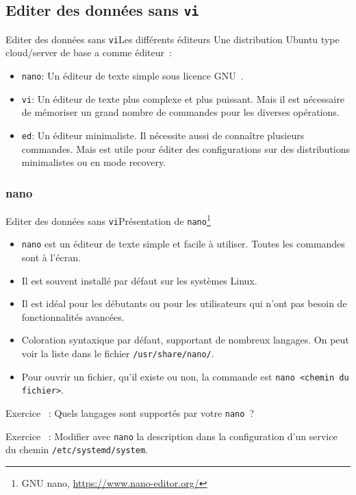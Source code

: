 \documentclass{beamer}
\begin{document}
    \subsection{Editer des données sans \lstinline{vi}}\label{subsec:edit-whithout-vi}


    \begin{frame}{Editer des données sans \lstinline{vi}}{Les différents éditeurs}
        Une distribution Ubuntu type cloud/server de base a comme éditeur~:
        \begin{itemize}
            \item \lstinline{nano}: Un éditeur de texte simple sous licence GNU~.
            \item \lstinline{vi}: Un éditeur de texte plus complexe et plus puissant.
            Mais il est nécessaire de mémoriser un grand nombre de commandes pour les diverses opérations.
            \item \lstinline{ed}: Un éditeur minimaliste.
            Il nécessite aussi de connaître plusieurs commandes.
            Mais est utile pour éditer des configurations sur des distributions minimalistes ou en mode recovery.
        \end{itemize}
    \end{frame}

    \subsubsection{nano}\label{subsubsec:nano}
    \begin{frame}{Editer des données sans \lstinline{vi}}{Présentation de \lstinline{nano}\footnote{\label{nano}GNU nano, \url{https://www.nano-editor.org/}}}
        \begin{itemize}
            \item \lstinline{nano} est un éditeur de texte simple et facile à utiliser.
            Toutes les commandes sont à l'écran.
            \item Il est souvent installé par défaut sur les systèmes Linux.
            \item Il est idéal pour les débutants ou pour les utilisateurs qui n'ont pas besoin de fonctionnalités avancées.
            \item Coloration syntaxique par défaut, supportant de nombreux langages.
            On peut voir la liste dans le fichier \lstinline{/usr/share/nano/}.
            \item Pour ouvrir un fichier, qu'il existe ou non, la commande est \lstinline{nano <chemin du fichier>}.
        \end{itemize}
        Exercice \execcounterdispinc~: Quels langages sont supportés par votre \lstinline{nano}~?

        Exercice \execcounterdispinc~: Modifier avec \lstinline{nano} la description dans la configuration d'un service du chemin \lstinline{/etc/systemd/system}.
    \end{frame}
\end{document}
